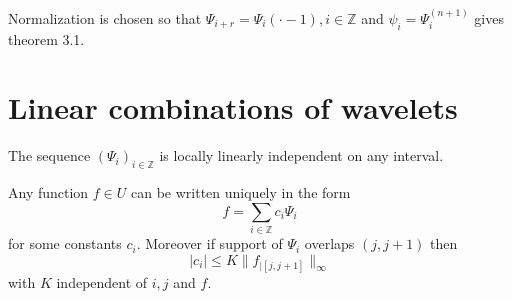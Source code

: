 \documentclass[a4paper, 11pt]{article}
\begin{document}
Normalization is chosen so that $\Psi_{i+r} = \Psi_{i}(\cdot - 1), i \in \mathbb{Z}$ and $\psi_i = \Psi_i^{(n+1)}$ gives 
theorem 3.1.

\section{Linear combinations of wavelets}

\begin{thm}{4.1}
  The sequence ${(\Psi_i)}_{i \in \mathbb{Z}}$ is locally linearly independent on any interval.
\end{thm}

\begin{cor}{4.1}
  Any function $f \in U$ can be written uniquely in the form
  \begin{equation*}
    f = \sum_{i \in \mathbb{Z}} c_i \Psi_i
  \end{equation*}
  for some constants $c_i$. Moreover if support of $\Psi_i$ overlaps $(j, j+1)$ then
  \begin{equation*}
    |c_i| \leq K \| f_{|[j, j+1]} \|_{\infty}
  \end{equation*}
  with $K$ independent of $i,j$ and $f$.
\end{cor}
\end{document}
